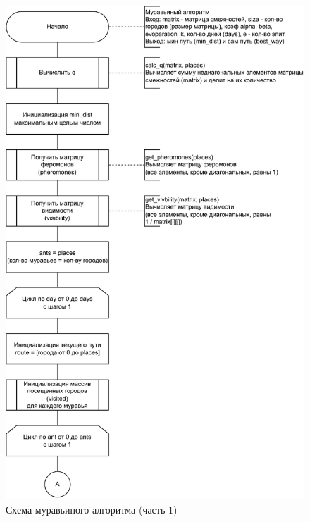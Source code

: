 \begin{figure}[h!]
	\centering
	\includegraphics[width=0.9\linewidth]{img/ant}
	\caption{Схема муравьиного алгоритма (часть 1)}
	\label{fig:ant}
\end{figure}
